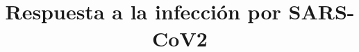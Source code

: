 \documentclass{bmcart}
\begin{document}
	\begin{frontmatter}
	
		\begin{fmbox}
			
			
			\title{Respuesta a la infección por SARS-CoV2}
			
			
			\author[
			  addressref={aff1},                   %
			  corref={aff1},                       %
			  email={carmenarrabali@uma.es}  		%
			]{ } %
			
			\author[
			  addressref={aff1},
			  email={olegbrz@uma.es}
			]{ }
			
			\author[
			addressref={aff1},
			email={jaherreraconde@uma.es}
			]{ }
			
			\author[
			addressref={aff1},
			email={smv762e@uma.es}
			]{ }
			
			
			
			\address[id=aff1]{%
			  ,             %
			  ,          %
			  ,                              %
			}
		
		\end{fmbox}%
		
		\begin{abstractbox}
		
			\begin{abstract} %
			
			

\end{abstract}
\end{abstractbox}
\end{frontmatter}
\end{document}
